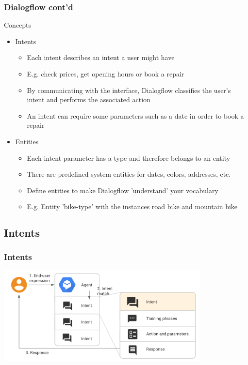 \documentclass{beamer}
\begin{document}
\begin{frame}
\frametitle{Dialogflow cont'd}
\begin{block}{Concepts}
\begin{itemize}
\item Intents
\begin{itemize}
\item Each intent describes an intent a user might have
\item E.g. check prices, get opening hours or book a repair
\item By communicating with the interface, Dialogflow classifies the user's intent and performs the associated action
\item An intent can require some parameters such as a date in order to book a repair
\end{itemize}
\item Entities
\begin{itemize}
\item Each intent parameter has a type and therefore belongs to an entity
\item There are predefined system entities for dates, colors, addresses, etc.
\item Define entities to make Dialogflow 'understand' your vocabulary
\item E.g. Entity 'bike-type' with the instances road bike and mountain bike
\end{itemize}
\end{itemize}
\end{block}
\end{frame}



\subsection{Intents}

\begin{frame}
\frametitle{Intents}
\begin{center}
\includegraphics[width=0.8\textwidth]{pictures/intent.png}

\end{center}
\end{frame}
\end{document}
